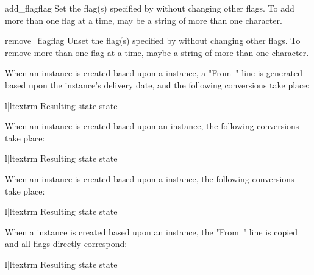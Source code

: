 \begin{methoddesc}{add_flag}{flag}
Set the flag(s) specified by  without changing other flags. To add
more than one flag at a time,  may be a string of more than one
character.
\end{methoddesc}

\begin{methoddesc}{remove_flag}{flag}
Unset the flag(s) specified by  without changing other flags. To
remove more than one flag at a time,  maybe a string of more than one
character.
\end{methoddesc}

When an  instance is created based upon a
 instance, a "From~" line is generated based upon the
 instance's delivery date, and the following conversions
take place:

\begin{tableii}{l|l}{textrm}
    {Resulting state}{ state}
\end{tableii}

When an  instance is created based upon an 
instance, the following conversions take place:

\begin{tableii}{l|l}{textrm}
    {Resulting state}{ state}
\end{tableii}

When an  instance is created based upon a
 instance, the following conversions take place:

\begin{tableii}{l|l}{textrm}
    {Resulting state}{ state}
\end{tableii}

When a  instance is created based upon an 
instance, the "From~" line is copied and all flags directly correspond:

\begin{tableii}{l|l}{textrm}
    {Resulting state}{ state}
\end{tableii}

